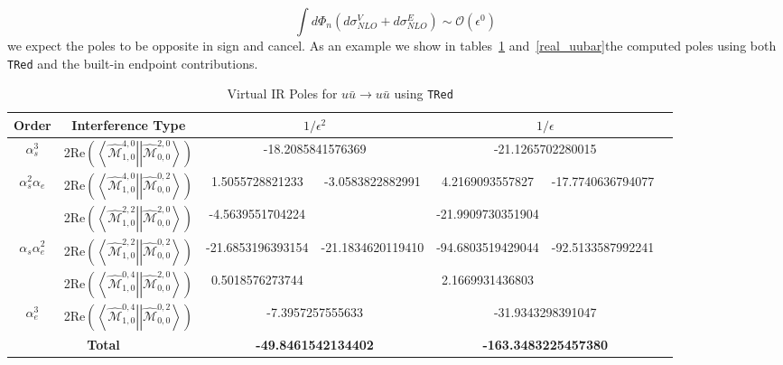 \documentclass[a4paper]{article}
\def \TRed{\texttt{TRed} }
\def \MBra#1#2#3#4{\left<\hat{\mathcal{M}}_{#1,#2}^{#3,#4}\right|}
\def \MKet#1#2#3#4{\left|\hat{\mathcal{M}}_{#1,#2}^{#3,#4}\right>}
\begin{document}
\begin{equation}
 \int d\Phi_n \left(d\sigma_{NLO}^V + d\sigma_{NLO}^E\right) \sim \mathcal{O}(\epsilon^0)
\end{equation}
we expect the poles to be opposite in sign and cancel. As an example we show in tables~\ref{virt_uubar} and~\ref{real_uubar}the computed poles using both \TRed and the built-in endpoint contributions. 


\begin{table}[]
\begin{center}
 \begin{tabular}{c|c|c|c|c|c|c}
 Order& Interference Type
 & \multicolumn{2}{c}{$1/\epsilon^{2}$} 
 & \multicolumn{2}{|c|}{$1/\epsilon$}\\\hline
 $\alpha_s^3$                           
 & 2Re$\left(\MBra{1}{0}{4}{0}\MKet{0}{0}{2}{0}\right)$
 & \multicolumn{2}{c|}{-18.2085841576369} 
 & \multicolumn{2}{c|}{-21.1265702280015} \\\hline
 \multirow{2}{*}{$\alpha_s^2\alpha_e$}                                                        
 & 2Re$\left(\MBra{1}{0}{4}{0}\MKet{0}{0}{0}{2}\right)$
 & 1.5055728821233 & \multirow{2}{*}{-3.0583822882991} 
 & 4.2169093557827 & \multirow{2}{*}{-17.7740636794077} \\
 & 2Re$\left(\MBra{1}{0}{2}{2}\MKet{0}{0}{2}{0}\right)$
 & -4.5639551704224 && -21.9909730351904 &\\\hline
 \multirow{2}{*}{$\alpha_s\alpha_e^2$}                                                  
 & 2Re$\left(\MBra{1}{0}{2}{2}\MKet{0}{0}{0}{2}\right)$
 & -21.6853196393154 & \multirow{2}{*}{-21.1834620119410} 
 & -94.6803519429044 & \multirow{2}{*}{-92.5133587992241} \\
 & 2Re$\left(\MBra{1}{0}{0}{4}\MKet{0}{0}{2}{0}\right)$
 & 0.5018576273744 && 2.1669931436803 &\\\hline
 $\alpha_e^3$                                                                             
 & 2Re$\left(\MBra{1}{0}{0}{4}\MKet{0}{0}{0}{2}\right)$
 & \multicolumn{2}{c|}{-7.3957257555633} 
 & \multicolumn{2}{c|}{-31.9343298391047} \\\hline
   \multicolumn{2}{c|}{\textbf{Total}}     
 & \multicolumn{2}{c|}{\textbf{-49.8461542134402}} 
 & \multicolumn{2}{c|}{\textbf{-163.3483225457380}}\\\hline
 \end{tabular}
 \end{center}
 \caption{Virtual IR Poles for $u\bar u\longrightarrow u\bar u$ using \TRed}
 \label{virt_uubar}
\end{table}
\end{document}
